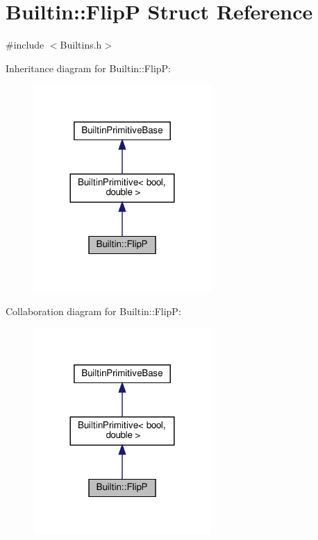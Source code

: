 \hypertarget{struct_builtin_1_1_flip_p}{}\section{Builtin\+:\+:FlipP Struct Reference}
\label{struct_builtin_1_1_flip_p}


{\ttfamily \#include $<$Builtins.\+h$>$}



Inheritance diagram for Builtin\+:\+:FlipP\+:
\nopagebreak
\begin{figure}[H]
\begin{center}
\leavevmode
\includegraphics[width=192pt]{struct_builtin_1_1_flip_p__inherit__graph}
\end{center}
\end{figure}


Collaboration diagram for Builtin\+:\+:FlipP\+:
\nopagebreak
\begin{figure}[H]
\begin{center}
\leavevmode
\includegraphics[width=192pt]{struct_builtin_1_1_flip_p__coll__graph}
\end{center}
\end{figure}
